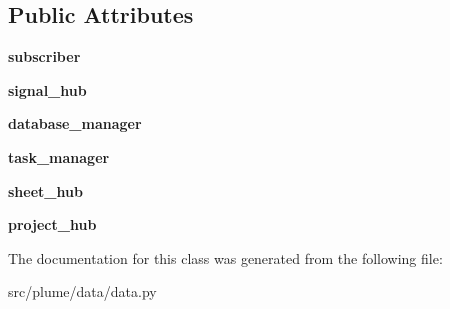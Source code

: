 \subsection*{Public Attributes}
\begin{DoxyCompactItemize}
\item 
{\bfseries subscriber}\hypertarget{classplume-creator_1_1src_1_1plume_1_1data_1_1data_1_1_data_a3737f1973848c2077320f83e8ac2cc46}{}\label{classplume-creator_1_1src_1_1plume_1_1data_1_1data_1_1_data_a3737f1973848c2077320f83e8ac2cc46}

\item 
{\bfseries signal\+\_\+hub}\hypertarget{classplume-creator_1_1src_1_1plume_1_1data_1_1data_1_1_data_ac19a270bcd14e5c58c2babf07c5fd06a}{}\label{classplume-creator_1_1src_1_1plume_1_1data_1_1data_1_1_data_ac19a270bcd14e5c58c2babf07c5fd06a}

\item 
{\bfseries database\+\_\+manager}\hypertarget{classplume-creator_1_1src_1_1plume_1_1data_1_1data_1_1_data_a8689cfc26af4d2aeeb031229c6f5c60a}{}\label{classplume-creator_1_1src_1_1plume_1_1data_1_1data_1_1_data_a8689cfc26af4d2aeeb031229c6f5c60a}

\item 
{\bfseries task\+\_\+manager}\hypertarget{classplume-creator_1_1src_1_1plume_1_1data_1_1data_1_1_data_adfe0ec942ef3c883e05267795b084178}{}\label{classplume-creator_1_1src_1_1plume_1_1data_1_1data_1_1_data_adfe0ec942ef3c883e05267795b084178}

\item 
{\bfseries sheet\+\_\+hub}\hypertarget{classplume-creator_1_1src_1_1plume_1_1data_1_1data_1_1_data_ad213a2479b040f36582e93ee03b4d774}{}\label{classplume-creator_1_1src_1_1plume_1_1data_1_1data_1_1_data_ad213a2479b040f36582e93ee03b4d774}

\item 
{\bfseries project\+\_\+hub}\hypertarget{classplume-creator_1_1src_1_1plume_1_1data_1_1data_1_1_data_a8847cd8437f40c59a39e7695622172c1}{}\label{classplume-creator_1_1src_1_1plume_1_1data_1_1data_1_1_data_a8847cd8437f40c59a39e7695622172c1}

\end{DoxyCompactItemize}


The documentation for this class was generated from the following file\+:\begin{DoxyCompactItemize}
\item 
src/plume/data/data.\+py\end{DoxyCompactItemize}
